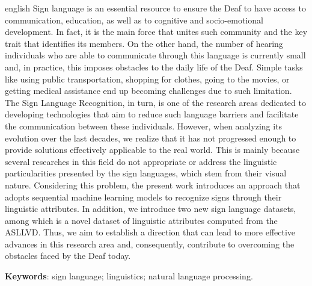 \begin{resumo}[Abstract]
  \begin{otherlanguage*}{english}
    \noindent
    Sign language is an essential resource to ensure the Deaf to have access to communication, education, as well as to cognitive and socio-emotional development. In fact, it is the main force that unites such community and the key trait that identifies its members.
    On the other hand, the number of hearing individuals who are able to communicate through this language is currently small and, in practice, this imposes obstacles to the daily life of the Deaf.
    Simple tasks like using public transportation, shopping for clothes, going to the movies, or getting medical assistance end up becoming challenges due to such limitation.
    The Sign Language Recognition, in turn, is one of the research areas dedicated to developing technologies that aim to reduce such language barriers and facilitate the communication between these individuals.
    However, when analyzing its evolution over the last decades, we realize that it has not progressed enough to provide solutions effectively applicable to the real world.
    This is mainly because several researches in this field do not appropriate or address the linguistic particularities presented by the sign languages, which stem from their visual nature.
    Considering this problem, the present work introduces an approach that adopts sequential machine learning models to recognize signs through their linguistic attributes. In addition, we introduce two new sign language datasets, among which is a novel dataset of linguistic attributes computed from the ASLLVD.
    Thus, we aim to establish a direction that can lead to more effective advances in this research area and, consequently, contribute to overcoming the obstacles faced by the Deaf today.

    \vspace{\onelineskip}

    \noindent
    \textbf{Keywords}: sign language; linguistics; natural language processing.
  \end{otherlanguage*}
\end{resumo}
